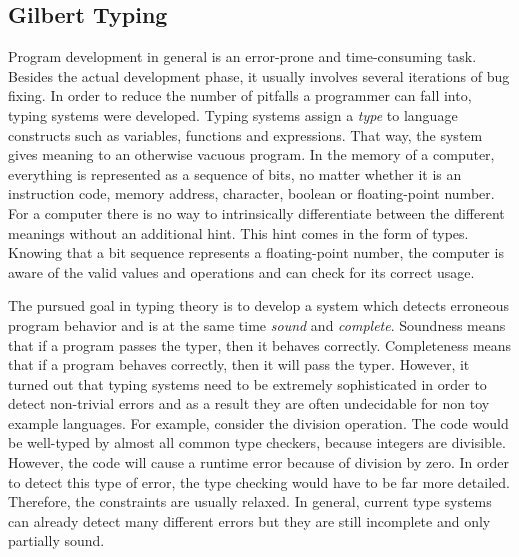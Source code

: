 \subsection{Gilbert Typing}
\label{cha:gilberttyping}

Program development in general is an error-prone and time-consuming task.
Besides the actual development phase, it usually involves several iterations of bug fixing.
In order to reduce the number of pitfalls a programmer can fall into, typing systems were developed.
Typing systems assign a \emph{type} to language constructs such as variables, functions and expressions.
That way, the system gives meaning to an otherwise vacuous program.
In the memory of a computer, everything is represented as a sequence of bits, no matter whether it is an instruction code, memory address, character, boolean or floating-point number.
For a computer there is no way to intrinsically differentiate between the different meanings without an additional hint.
This hint comes in the form of types.
Knowing that a bit sequence represents a floating-point number, the computer is aware of the valid values and operations and can check for its correct usage.

The pursued goal in typing theory is to develop a system which detects erroneous program behavior and is at the same time \emph{sound} and \emph{complete}.
Soundness means that if a program passes the typer, then it behaves correctly.
Completeness means that if a program behaves correctly, then it will pass the typer.
However, it turned out that typing systems need to be extremely sophisticated in order to detect non-trivial errors and as a result they are often undecidable for non toy example languages.
For example, consider the division operation.
The code  would be well-typed by almost all common type checkers, because integers are divisible.
However, the code will cause a runtime error because of division by zero.
In order to detect this type of error, the type checking would have to be far more detailed.
Therefore, the constraints are usually relaxed.
In general, current type systems can already detect many different errors but they are still incomplete and only partially sound.

